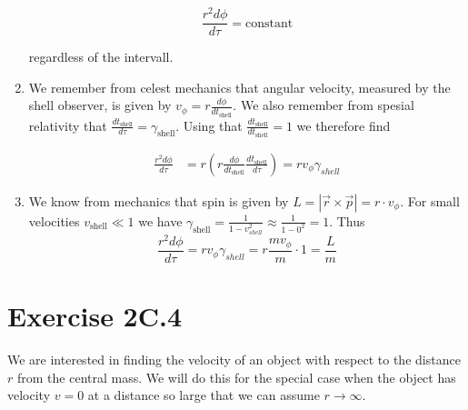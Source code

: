 \documentclass[a4paper,10pt,english]{article}
\begin{document}
\begin{enumerate}
\[\frac{r^{2}d\phi}{d\tau}=\text{constant}\] 

regardless of the intervall.

\item We remember from celest mechanics that angular velocity, measured by the shell observer, is given by $v_{\phi}=r\frac{d\phi}{dt_{\text{shell}}}$. We also remember from spesial relativity that $\frac{dt_{\text{shell}}}{d\tau}=\gamma_{\text{shell}}$. Using that $\frac{dt_{\text{shell}}}{dt_{\text{shell}}}=1$ we therefore find

\begin{align*}
\frac{r^{2}d\phi}{d\tau}&=r\left(r\frac{d\phi}{dt_{\text{shell}}}\frac{dt_{\text{shell}}}{d\tau}\right)=rv_{\phi}\gamma_{shell}
\end{align*}

\item We know from mechanics that spin is given by $L=|\vec{r}\times\vec{p}|=r\cdot v_{\phi}$. For small velocities $v_{\text{shell}}\ll1$ we have $\gamma_{\text{shell}}=\frac{1}{1-v_{shell}^{2}}\approx\frac{1}{1-0^{2}}=1$. Thus \[\frac{r^{2}d\phi}{d\tau}=rv_{\phi}\gamma_{shell}=r\frac{mv_{\phi}}{m}\cdot1=\frac{L}{m}\]
 
\end{enumerate}








\section*{Exercise 2C.4}

We are interested in finding the velocity of an object with respect to the distance $r$ from the central mass. We will do this for the special case when the object has velocity $v=0$ at a distance so large that we can assume $r\to\infty$.
\end{document}
